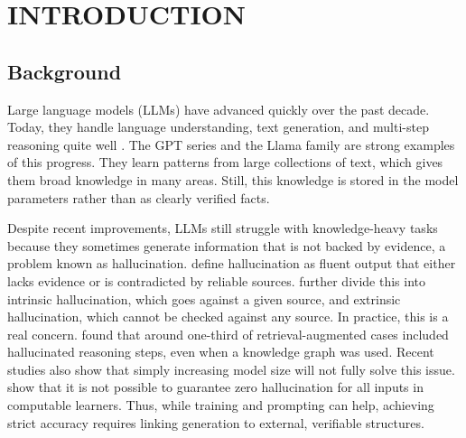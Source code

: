 
\chapter{INTRODUCTION}

\ifpdf
  \graphicspath{{introduction/figures/PNG}{introduction/figures/PDF}{introduction/figures}}
\else
  \graphicspath{{introduction/figures/EPS}{introduction/figures}}
\fi

\section{Background}

Large language models (LLMs) have advanced quickly over the past decade. Today, they handle language understanding, text generation, and multi-step reasoning quite well \citep{brown2020gpt3,openai2024gpt4technicalreport}. The GPT series \citep{brown2020gpt3,openai2024gpt4technicalreport} and the Llama family \citep{touvron2023llama,dubey2024llama} are strong examples of this progress. They learn patterns from large collections of text, which gives them broad knowledge in many areas. Still, this knowledge is stored in the model parameters rather than as clearly verified facts.

Despite recent improvements, LLMs still struggle with knowledge-heavy tasks because they sometimes generate information that is not backed by evidence, a problem known as hallucination. \citet{ji2023survey} define hallucination as fluent output that either lacks evidence or is contradicted by reliable sources. \citet{huang2023survey} further divide this into intrinsic hallucination, which goes against a given source, and extrinsic hallucination, which cannot be checked against any source. In practice, this is a real concern. \citet{luo2025-graph-constrained-reasoning} found that around one-third of retrieval-augmented cases included hallucinated reasoning steps, even when a knowledge graph was used. Recent studies also show that simply increasing model size will not fully solve this issue. \citet{xu2025hallucinationinevitableinnatelimitation} show that it is not possible to guarantee zero hallucination for all inputs in computable learners. Thus, while training and prompting can help, achieving strict accuracy requires linking generation to external, verifiable structures.

